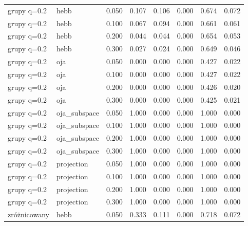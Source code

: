 \begin{tabular}{llrrrrrr}
grupy q=0.2 & hebb & 0.050 & 0.107 & 0.106 & 0.000 & 0.674 & 0.072 \\

grupy q=0.2 & hebb & 0.100 & 0.067 & 0.094 & 0.000 & 0.661 & 0.061 \\

grupy q=0.2 & hebb & 0.200 & 0.044 & 0.044 & 0.000 & 0.654 & 0.053 \\

grupy q=0.2 & hebb & 0.300 & 0.027 & 0.024 & 0.000 & 0.649 & 0.046 \\

grupy q=0.2 & oja & 0.050 & 0.000 & 0.000 & 0.000 & 0.427 & 0.022 \\

grupy q=0.2 & oja & 0.100 & 0.000 & 0.000 & 0.000 & 0.427 & 0.022 \\

grupy q=0.2 & oja & 0.200 & 0.000 & 0.000 & 0.000 & 0.426 & 0.020 \\

grupy q=0.2 & oja & 0.300 & 0.000 & 0.000 & 0.000 & 0.425 & 0.021 \\

grupy q=0.2 & oja\_subspace & 0.050 & 1.000 & 0.000 & 0.000 & 1.000 & 0.000 \\

grupy q=0.2 & oja\_subspace & 0.100 & 1.000 & 0.000 & 0.000 & 1.000 & 0.000 \\

grupy q=0.2 & oja\_subspace & 0.200 & 1.000 & 0.000 & 0.000 & 1.000 & 0.000 \\

grupy q=0.2 & oja\_subspace & 0.300 & 1.000 & 0.000 & 0.000 & 1.000 & 0.000 \\

grupy q=0.2 & projection & 0.050 & 1.000 & 0.000 & 0.000 & 1.000 & 0.000 \\

grupy q=0.2 & projection & 0.100 & 1.000 & 0.000 & 0.000 & 1.000 & 0.000 \\

grupy q=0.2 & projection & 0.200 & 1.000 & 0.000 & 0.000 & 1.000 & 0.000 \\

grupy q=0.2 & projection & 0.300 & 1.000 & 0.000 & 0.000 & 1.000 & 0.000 \\

zróżnicowany & hebb & 0.050 & 0.333 & 0.111 & 0.000 & 0.718 & 0.072 \\


\end{tabular}
